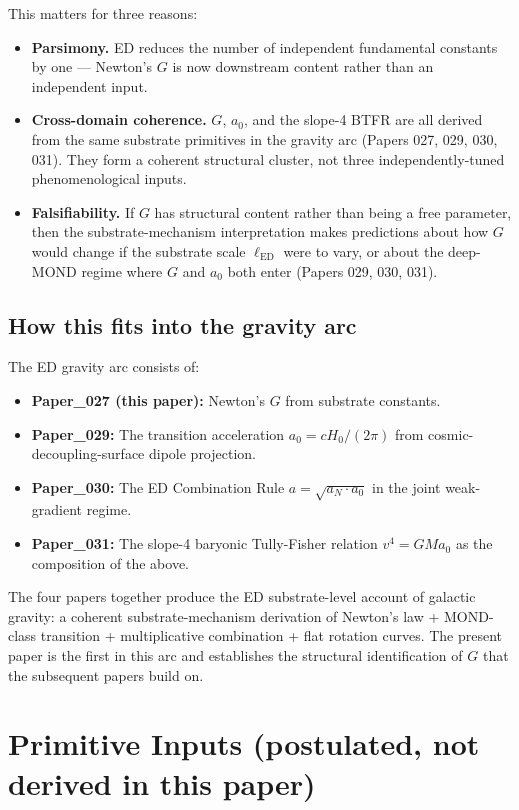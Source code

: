 \documentclass[11pt,a4paper]{article}
\begin{document}
This matters for three reasons:

\begin{itemize}[noitemsep]
\item \textbf{Parsimony.} ED reduces the number of independent fundamental constants by one --- Newton's $G$ is now downstream content rather than an independent input.
\item \textbf{Cross-domain coherence.} $G$, $a_0$, and the slope-4 BTFR are all derived from the same substrate primitives in the gravity arc (Papers 027, 029, 030, 031). They form a coherent structural cluster, not three independently-tuned phenomenological inputs.
\item \textbf{Falsifiability.} If $G$ has structural content rather than being a free parameter, then the substrate-mechanism interpretation makes predictions about how $G$ would change if the substrate scale $\ell_\mathrm{ED}$ were to vary, or about the deep-MOND regime where $G$ and $a_0$ both enter (Papers 029, 030, 031).
\end{itemize}

\subsection{How this fits into the gravity arc}

The ED gravity arc consists of:

\begin{itemize}[noitemsep]
\item \textbf{Paper\_027 (this paper):} Newton's $G$ from substrate constants.
\item \textbf{Paper\_029:} The transition acceleration $a_0 = cH_0/(2\pi)$ from cosmic-decoupling-surface dipole projection.
\item \textbf{Paper\_030:} The ED Combination Rule $a = \sqrt{a_N \cdot a_0}$ in the joint weak-gradient regime.
\item \textbf{Paper\_031:} The slope-4 baryonic Tully-Fisher relation $v^4 = GMa_0$ as the composition of the above.
\end{itemize}

The four papers together produce the ED substrate-level account of galactic gravity: a coherent substrate-mechanism derivation of Newton's law + MOND-class transition + multiplicative combination + flat rotation curves. The present paper is the first in this arc and establishes the structural identification of $G$ that the subsequent papers build on.

\section{Primitive Inputs (postulated, not derived in this paper)}
\end{document}
